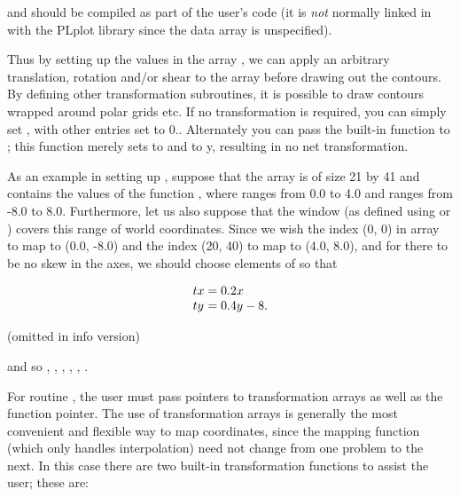 and should be compiled as part of the user's code (it is \emph{not}
normally linked in with the PLplot library since the  data
array is unspecified).

Thus by setting up the values in the array , we can apply an
arbitrary translation, rotation and/or shear to the array before drawing
out the contours.  By defining other transformation subroutines, it is
possible to draw contours wrapped around polar grids etc.  If no
transformation is required, you can simply set , with other entries set to 0..  Alternately you can pass the
built-in function  to ; this function merely
sets  to  and  to {y}, resulting in no net
transformation.

As an example in setting up , suppose that the array 
is of size 21 by 41 and contains the values of the function
, where  ranges from 0.0 to 4.0 and 
ranges from -8.0 to 8.0.  Furthermore, let us also suppose that the
window (as defined using
 or ) covers this range of world coordinates.
Since we wish the index (0, 0) in array  to map to (0.0, -8.0)
and the index (20, 40) to map to (4.0, 8.0), and for there to be no skew
in the axes, we should choose elements of  so that
\begin{tex}
\[
   \begin{array}{l@{\; = \;}l}
   tx & 0.2x \\
   ty & 0.4y - 8.
   \end{array}
\]
\end{tex}
\begin{ifinfo}

	(omitted in info version)

\end{ifinfo}
and so , , , 
, , .

For routine , the user must pass pointers to transformation
arrays as well as the function pointer.  The use of transformation
arrays is generally the most convenient and flexible way to map
coordinates, since the mapping function (which only handles
interpolation) need not change from one problem to the next.  In this
case there are two built-in transformation functions to assist the user;
these are:


